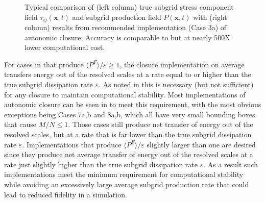 %
\begin{figure}
	\centering %
	\label{F:10a}
\end{figure}
%
\begin{figure}
	\ContinuedFloat
	\centering %
	\label{F:10b}
\end{figure}
%
\begin{figure}
	\ContinuedFloat
	\centering %
	\label{F:10c}
\end{figure}
%
\begin{figure}
	\ContinuedFloat
	\caption{Typical comparison of (left column) true subgrid stress component field $\tau_{ij}(\mathbf{x},t)$ and subgrid production field $P(\mathbf{x},t)$ with (right column) results from recommended implementation (Case 3a) of autonomic closure; Accuracy is comparable to  but at nearly 500X lower computational cost.}
	\label{F:10}
\end{figure}
%
%


For cases in  that produce $\langle P^F \rangle/\varepsilon \geq 1$, the closure implementation on average transfers energy out of the resolved scales at a rate equal to or higher than the true subgrid dissipation rate $\varepsilon$. As noted in  this is necessary (but not sufficient) for any closure to maintain computational stability.  Most implementations of autonomic closure can be seen in  to meet this requirement, with the most obvious exceptions being Cases 7a,b and 8a,b, which all have very small bounding boxes that cause $M/N \leq 1$. Those cases still produce net transfer of energy out of the resolved scales, but at a rate that is far lower than the true subgrid dissipation rate $\varepsilon$. Implementations that produce  $\langle P^F \rangle/\varepsilon$  slightly larger than one are desired since they produce net average transfer of energy out of the resolved scales at a rate just slightly higher than the true subgrid dissipation rate $\varepsilon$. As a result such implementations meet the minimum requirement for computational stability while avoiding an excessively large average subgrid production rate that could lead to reduced fidelity in a simulation. 



